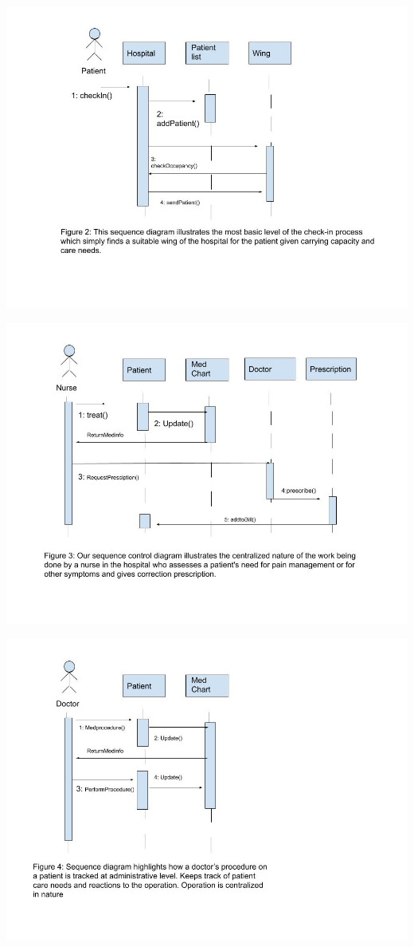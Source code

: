 \documentclass{article}
\begin{document}
\includegraphics{Sequence Diagram 1}

\includegraphics{Sequence diagarm 2}

\includegraphics{Sequence 3}
\end{document}
